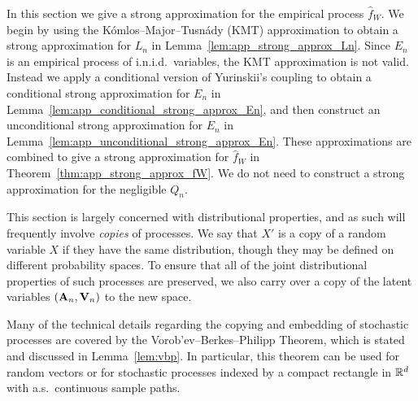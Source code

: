 In this section we give a strong approximation
for the empirical process $\hat f_W$.
We begin by using the
K\'omlos--Major--Tusn\'ady (KMT) approximation
to obtain a strong approximation for $L_n$
in Lemma~\ref{lem:app_strong_approx_Ln}.
Since $E_n$ is an empirical process of i.n.i.d.\ variables,
the KMT approximation is not valid.
Instead we apply a conditional version of
Yurinskii's coupling to obtain a
conditional strong approximation for $E_n$
in Lemma~\ref{lem:app_conditional_strong_approx_En},
and then construct an unconditional
strong approximation for $E_n$
in Lemma~\ref{lem:app_unconditional_strong_approx_En}.
These approximations are combined to give a
strong approximation for $\hat f_W$
in Theorem~\ref{thm:app_strong_approx_fW}.
We do not need to construct a strong approximation
for the negligible $Q_n$.

This section is largely concerned with
distributional properties,
and as such will frequently involve
\emph{copies} of processes.
We say that $X'$ is a copy of a random variable $X$
if they have the same distribution,
though they may be defined on different probability spaces.
To ensure that all of the joint distributional properties of
such processes are preserved,
we also carry over a copy of the latent variables
$(\mathbf{A}_n, \mathbf{V}_n)$
to the new space.

Many of the technical details regarding
the copying and embedding of stochastic processes
are covered by the
Vorob'ev--Berkes--Philipp Theorem,
which is stated and discussed in
Lemma~\ref{lem:vbp}.
In particular, this theorem can be used
for random vectors or for stochastic processes
indexed by a compact rectangle in $\mathbb{R}^d$
with a.s.\ continuous sample paths.

